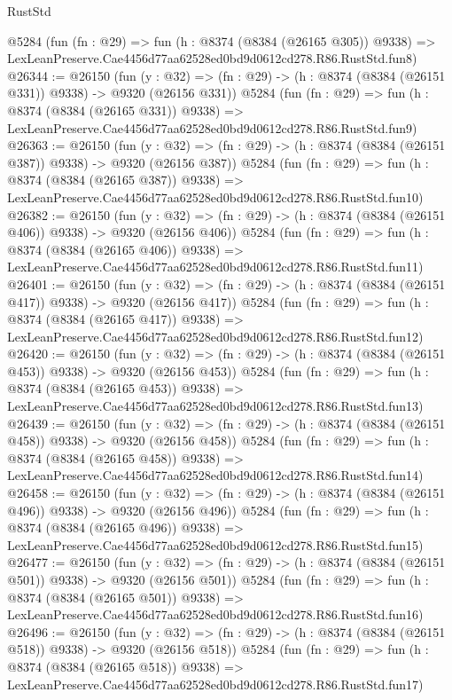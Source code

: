 \begin{lexlean}{RustStd}
\begin{coremodule}
    @5284
    (fun (fn : @29) =>
    fun (h : @8374 (@8384 (@26165 @305)) @9338) =>
    LexLeanPreserve.Cae4456d77aa62528ed0bd9d0612cd278.R86.RustStd.fun8)
@26344 := @26150
    (fun (y : @32) => (fn : @29) -> (h : @8374 (@8384 (@26151 @331)) @9338) -> @9320 (@26156 @331))
    @5284
    (fun (fn : @29) =>
    fun (h : @8374 (@8384 (@26165 @331)) @9338) =>
    LexLeanPreserve.Cae4456d77aa62528ed0bd9d0612cd278.R86.RustStd.fun9)
@26363 := @26150
    (fun (y : @32) => (fn : @29) -> (h : @8374 (@8384 (@26151 @387)) @9338) -> @9320 (@26156 @387))
    @5284
    (fun (fn : @29) =>
    fun (h : @8374 (@8384 (@26165 @387)) @9338) =>
    LexLeanPreserve.Cae4456d77aa62528ed0bd9d0612cd278.R86.RustStd.fun10)
@26382 := @26150
    (fun (y : @32) => (fn : @29) -> (h : @8374 (@8384 (@26151 @406)) @9338) -> @9320 (@26156 @406))
    @5284
    (fun (fn : @29) =>
    fun (h : @8374 (@8384 (@26165 @406)) @9338) =>
    LexLeanPreserve.Cae4456d77aa62528ed0bd9d0612cd278.R86.RustStd.fun11)
@26401 := @26150
    (fun (y : @32) => (fn : @29) -> (h : @8374 (@8384 (@26151 @417)) @9338) -> @9320 (@26156 @417))
    @5284
    (fun (fn : @29) =>
    fun (h : @8374 (@8384 (@26165 @417)) @9338) =>
    LexLeanPreserve.Cae4456d77aa62528ed0bd9d0612cd278.R86.RustStd.fun12)
@26420 := @26150
    (fun (y : @32) => (fn : @29) -> (h : @8374 (@8384 (@26151 @453)) @9338) -> @9320 (@26156 @453))
    @5284
    (fun (fn : @29) =>
    fun (h : @8374 (@8384 (@26165 @453)) @9338) =>
    LexLeanPreserve.Cae4456d77aa62528ed0bd9d0612cd278.R86.RustStd.fun13)
@26439 := @26150
    (fun (y : @32) => (fn : @29) -> (h : @8374 (@8384 (@26151 @458)) @9338) -> @9320 (@26156 @458))
    @5284
    (fun (fn : @29) =>
    fun (h : @8374 (@8384 (@26165 @458)) @9338) =>
    LexLeanPreserve.Cae4456d77aa62528ed0bd9d0612cd278.R86.RustStd.fun14)
@26458 := @26150
    (fun (y : @32) => (fn : @29) -> (h : @8374 (@8384 (@26151 @496)) @9338) -> @9320 (@26156 @496))
    @5284
    (fun (fn : @29) =>
    fun (h : @8374 (@8384 (@26165 @496)) @9338) =>
    LexLeanPreserve.Cae4456d77aa62528ed0bd9d0612cd278.R86.RustStd.fun15)
@26477 := @26150
    (fun (y : @32) => (fn : @29) -> (h : @8374 (@8384 (@26151 @501)) @9338) -> @9320 (@26156 @501))
    @5284
    (fun (fn : @29) =>
    fun (h : @8374 (@8384 (@26165 @501)) @9338) =>
    LexLeanPreserve.Cae4456d77aa62528ed0bd9d0612cd278.R86.RustStd.fun16)
@26496 := @26150
    (fun (y : @32) => (fn : @29) -> (h : @8374 (@8384 (@26151 @518)) @9338) -> @9320 (@26156 @518))
    @5284
    (fun (fn : @29) =>
    fun (h : @8374 (@8384 (@26165 @518)) @9338) =>
    LexLeanPreserve.Cae4456d77aa62528ed0bd9d0612cd278.R86.RustStd.fun17)

\end{coremodule}
\end{lexlean}
